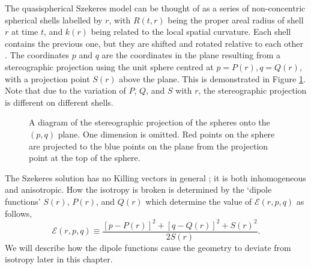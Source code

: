 \documentclass[a4paper,12pt]{report}
\begin{document}
The quasispherical Szekeres model can be thought of as a series of non-concentric spherical shells labelled by $r$, with $R(t,r)$ being the proper areal radius of shell $r$ at time $t$, and $k(r)$ being related to the local spatial curvature. Each shell contains the previous one, but they are shifted and rotated relative to each other \cite{RN1,RN11}.
The coordinates $p$ and $q$ are the coordinates in the plane resulting from a stereographic projection using the unit sphere centred at $p=P(r), q=Q(r)$, with a projection point $S(r)$ above the plane.
This is demonstrated in Figure \ref{fig: szekeres - stereographic projection}. Note that due to the variation of $P$, $Q$, and $S$ with $r$, the stereographic projection is different on different shells.

\begin{figure}
  \centering
  \def\svgwidth{100mm}
  
  \caption{A diagram of the stereographic projection of the spheres onto the $(p,q)$ plane. One dimension is omitted. Red points on the sphere are projected to the blue points on the plane from the projection point at the top of the sphere.}
  \label{fig: szekeres - stereographic projection}
\end{figure}

The Szekeres solution has no Killing vectors in general \cite{RN13}; it is both inhomogeneous and anisotropic. How the isotropy is broken is determined by the `dipole functions' $S(r)$, $P(r)$, and $Q(r)$ which determine the value of $\mathcal{E}(r,p,q)$ as follows,
\begin{equation} \label{eqn: szekeres E definition}
  \mathcal{E}(r,p,q) \equiv \frac{[p-P(r)]^2+[q-Q(r)]^2+S(r)^2}{2S(r)}.
\end{equation}
We will describe how the dipole functions cause the geometry to deviate from isotropy later in this chapter.
\end{document}
